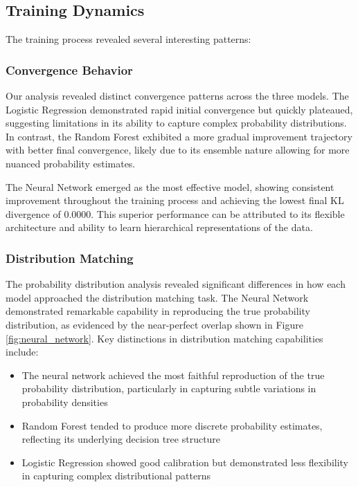 \documentclass[preprint,12pt]{elsarticle}
\begin{document}
\subsection{Training Dynamics}
The training process revealed several interesting patterns:

\subsubsection{Convergence Behavior}
Our analysis revealed distinct convergence patterns across the three models. The Logistic Regression demonstrated rapid initial convergence but quickly plateaued, suggesting limitations in its ability to capture complex probability distributions. In contrast, the Random Forest exhibited a more gradual improvement trajectory with better final convergence, likely due to its ensemble nature allowing for more nuanced probability estimates.

The Neural Network emerged as the most effective model, showing consistent improvement throughout the training process and achieving the lowest final KL divergence of 0.0000. This superior performance can be attributed to its flexible architecture and ability to learn hierarchical representations of the data.

\subsubsection{Distribution Matching}
The probability distribution analysis revealed significant differences in how each model approached the distribution matching task. The Neural Network demonstrated remarkable capability in reproducing the true probability distribution, as evidenced by the near-perfect overlap shown in Figure \ref{fig:neural_network}. Key distinctions in distribution matching capabilities include:

\begin{itemize}
    \item The neural network achieved the most faithful reproduction of the true probability distribution, particularly in capturing subtle variations in probability densities
    \item Random Forest tended to produce more discrete probability estimates, reflecting its underlying decision tree structure
    \item Logistic Regression showed good calibration but demonstrated less flexibility in capturing complex distributional patterns
\end{itemize}
\end{document}

